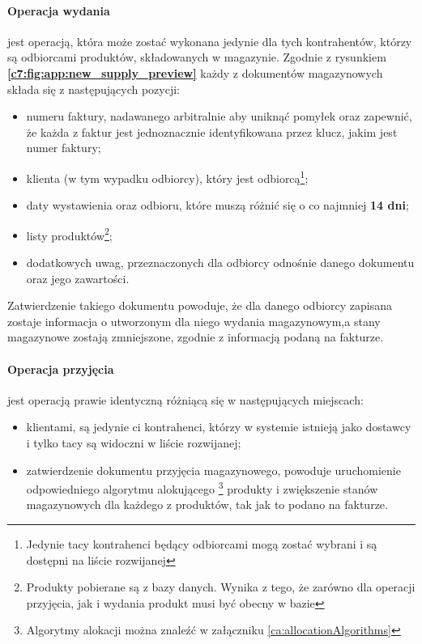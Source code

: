 		\paragraph{Operacja wydania} jest operacją, która może zostać wykonana jedynie dla tych kontrahentów, którzy są odbiorcami
		produktów, składowanych w magazynie. Zgodnie z rysunkiem \textbf{\ref{c7:fig:app:new_supply_preview}} każdy z dokumentów
		magazynowych składa się z następujących pozycji:
		\begin{itemize}
			\item numeru faktury, nadawanego arbitralnie aby uniknąć pomyłek oraz zapewnić, że każda z faktur jest 
			jednoznacznie identyfikowana przez klucz, jakim jest numer faktury;
			\item klienta (w tym wypadku odbiorcy), który jest odbiorcą\footnote{Jedynie tacy kontrahenci będący odbiorcami mogą
			zostać wybrani i są dostępni na liście rozwijanej};
			\item daty wystawienia oraz odbioru, które muszą różnić się o co najmniej \textbf{14 dni};
			\item listy produktów\footnote{Produkty pobierane są z bazy danych. Wynika z tego, że zarówno dla operacji przyjęcia, jak i wydania
			produkt musi być obecny w bazie};
			\item dodatkowych uwag, przeznaczonych dla odbiorcy odnośnie danego dokumentu oraz jego zawartości.
		\end{itemize}
		Zatwierdzenie takiego dokumentu powoduje, że dla danego odbiorcy zapisana zostaje informacja o utworzonym dla niego
		wydania magazynowym,a stany magazynowe zostają zmniejszone, zgodnie z informacją podaną na fakturze. 
		
		\paragraph{Operacja przyjęcia} jest operacją prawie identyczną różniącą się w następujących miejscach:
		\begin{itemize}
			\item klientami, są jedynie ci kontrahenci, którzy w systemie istnieją jako dostawcy i tylko tacy są widoczni
			w liście rozwijanej;
			\item zatwierdzenie dokumentu przyjęcia magazynowego, powoduje uruchomienie odpowiedniego algorytmu alokującego
			\footnote{Algorytmy alokacji można znaleźć w załączniku \ref{ca:allocationAlgorithms}}
			produkty i zwiększenie stanów magazynowych dla każdego z produktów, tak jak to podano na fakturze.
		\end{itemize}
		
